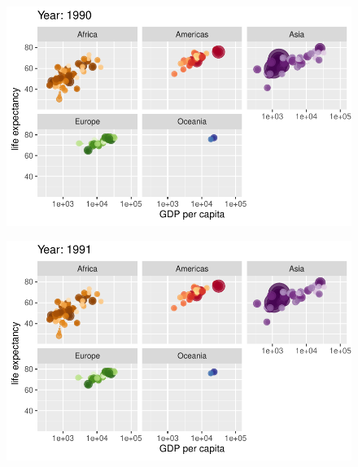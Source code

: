 \documentclass[
  letterpaper,
  DIV=11,
  numbers=noendperiod]{scrartcl}
\begin{document}
\begin{figure}[H]

{\centering \includegraphics{class05_files/figure-pdf/unnamed-chunk-24-70.pdf}

}

\end{figure}

\begin{figure}[H]

{\centering \includegraphics{class05_files/figure-pdf/unnamed-chunk-24-71.pdf}

}

\end{figure}
\end{document}
